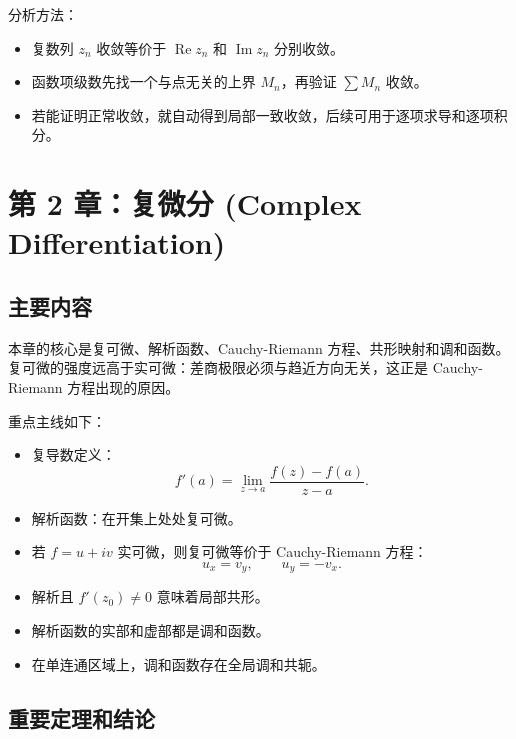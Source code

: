 \documentclass{article}
\renewcommand{\Re}{\operatorname{Re}}
\renewcommand{\Im}{\operatorname{Im}}
\begin{document}
分析方法：

\begin{itemize}
\item
  复数列 $z_n$ 收敛等价于 $\Re z_n$ 和 $\Im z_n$
  分别收敛。
\item
  函数项级数先找一个与点无关的上界 $M_n$，再验证
  $\sum M_n$ 收敛。
\item
  若能证明正常收敛，就自动得到局部一致收敛，后续可用于逐项求导和逐项积分。
\end{itemize}

\section{第 2 章：复微分 (Complex Differentiation)}

\subsection{主要内容}

本章的核心是复可微、解析函数、Cauchy-Riemann
方程、共形映射和调和函数。复可微的强度远高于实可微：差商极限必须与趋近方向无关，这正是
Cauchy-Riemann 方程出现的原因。

重点主线如下：

\begin{itemize}
\item
  复导数定义： \[
  f'(a)=\lim_{z\to a}\frac{f(z)-f(a)}{z-a}.
  \]
\item
  解析函数：在开集上处处复可微。
\item
  若 $f=u+iv$ 实可微，则复可微等价于 Cauchy-Riemann 方程： \[
  u_x=v_y,\qquad u_y=-v_x.
  \]
\item
  解析且 $f'(z_0)\ne 0$ 意味着局部共形。
\item
  解析函数的实部和虚部都是调和函数。
\item
  在单连通区域上，调和函数存在全局调和共轭。
\end{itemize}

\subsection{重要定理和结论}
\end{document}
